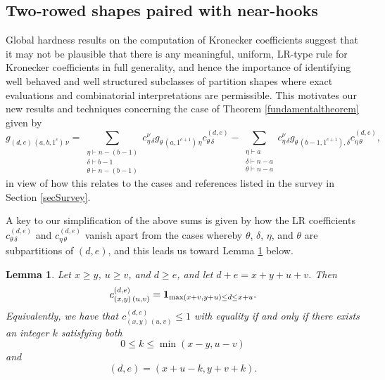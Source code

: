 \documentclass[12pt]{article}
\newtheorem{lemma}{Lemma}%
\begin{document}
\subsection{Two-rowed shapes paired with near-hooks}\label{twonearhook}
 Global hardness results on the computation of Kronecker coefficients \cite{BurgisserIkenmeyer2008,IkenmeyerMulmuleyWalter2017} 
 suggest that it may not be plausible that there is any meaningful, uniform, LR-type rule for Kronecker coefficients in full generality, and 
 hence the importance of identifying well behaved and well structured subclasses of partition shapes where exact evaluations and 
 combinatorial interpretations are permissible. This motivates our new results and techniques concerning the case of Theorem 
 \ref{fundamentaltheorem} given by $$ g_{(d, e) \, (a, b, 1^{c}) \, \nu} = \sum_{\substack{ \eta \vdash n - (b-1) \\ \delta \vdash b - 
 1 \\ \theta \vdash n -(b-1) }} c_{\eta \, \delta}^{\nu} g_{\theta \, (a, 1^{c+1}) \, \eta } c^{(d, e)}_{\theta \, \delta} - \sum_{\substack{ \eta 
 \vdash a \\ \delta \vdash n-a \\ \theta \vdash n-a }} c_{\eta \, \delta}^{\nu} g_{\theta \, (b-1, 1^{c+1}), \delta } c^{(d, e)}_{\eta \, 
 \theta}, $$ in view of how this relates to the cases and references listed in the survey in Section \ref{secSurvey}. 

 A key to our simplification of the above sums is given by how the LR coefficients $c^{(d, e)}_{\theta \, \delta}$ and $c^{(d, e)}_{\eta \, 
 \theta}$ vanish apart from the cases whereby $\theta$, $\delta$, $\eta$, and $\theta$ are subpartitions of $(d, e)$, and this leads us 
 toward Lemma \ref{LemLRtwo} below. 
 
\begin{lemma}\label{LemLRtwo}
 Let $x \geq y$, $u \geq v$, and $d \geq e$, and let $d+e = x + y + u + v$. Then 
\begin{equation}\label{displayLRtwo}
 c^{(d, e)}_{(x, y) \, (u, v)} = \text{{\bf 1}}_{\max(x+v, y+u) \leq d \leq x + u}. 
\end{equation}
 Equivalently, we have that $ c^{(d, e)}_{(x, y) \, (u, v)} \leq 1$ with equality if and only if there exists an integer $k$ satisfying both $$ 0 
 \leq k \leq \min(x - y, u - v) $$ and $$ (d, e) = (x + u - k, y + v + k). $$
\end{lemma}
\end{document}
